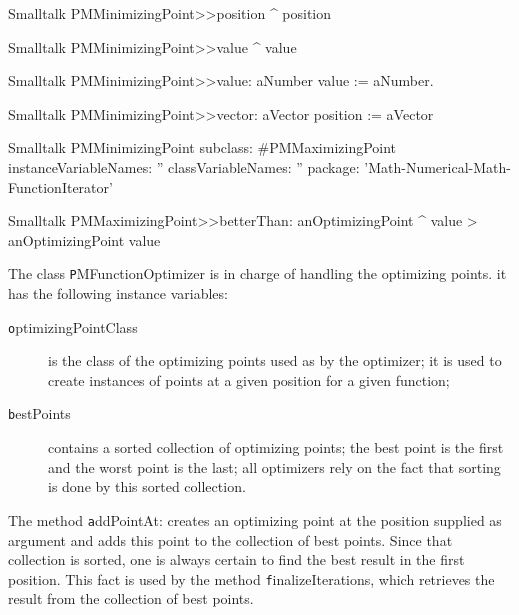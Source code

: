 \begin{displaycode}{Smalltalk}
PMMinimizingPoint>>position
   ^ position
\end{displaycode}


\begin{displaycode}{Smalltalk}
PMMinimizingPoint>>value
   ^ value
\end{displaycode}

\begin{displaycode}{Smalltalk}
PMMinimizingPoint>>value: aNumber
   value := aNumber.
\end{displaycode}

\begin{displaycode}{Smalltalk}
PMMinimizingPoint>>vector: aVector
    position := aVector
\end{displaycode}

\begin{displaycode}{Smalltalk}
PMMinimizingPoint subclass: #PMMaximizingPoint
   instanceVariableNames: ''
   classVariableNames: ''
   package: 'Math-Numerical-Math-FunctionIterator'
\end{displaycode}

\begin{displaycode}{Smalltalk}
PMMaximizingPoint>>betterThan: anOptimizingPoint
   ^ value > anOptimizingPoint value
\end{displaycode}
 
The class {\texttt PMFunctionOptimizer} is in charge of handling the
optimizing points. it has the following instance variables:
\begin{description}
  \item[\texttt optimizingPointClass] is the class of the optimizing
  points used as  by the optimizer; it is used
  to create instances of points at a given position for a given
  function;
  \item[\texttt bestPoints] contains a sorted collection of optimizing
  points; the best point is the first and the worst point is the
  last; all optimizers rely on the fact that sorting is done by this sorted collection.
\end{description}
The method {\texttt addPointAt:} creates an optimizing point at the
position supplied as argument and adds this point to the
collection of best points. Since that collection is sorted, one is
always certain to find the best result in the first position. This
fact is used by the method {\texttt finalizeIterations}, which
retrieves the result from the collection of best points.

